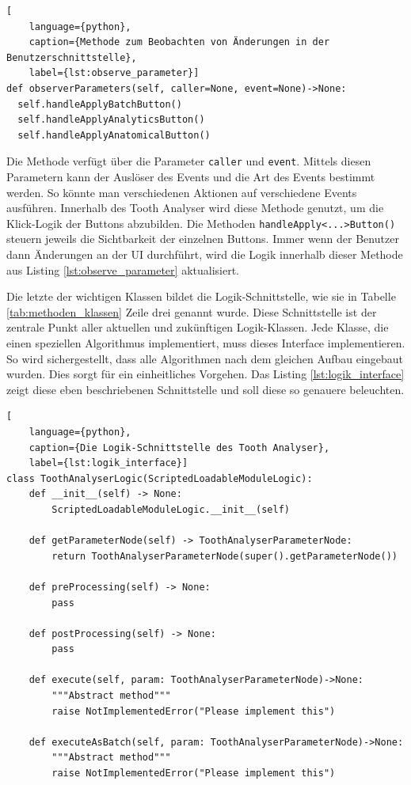 \begin{lstlisting}[
    language={python},
    caption={Methode zum Beobachten von Änderungen in der Benutzerschnittstelle},
    label={lst:observe_parameter}]
def observerParameters(self, caller=None, event=None)->None:
  self.handleApplyBatchButton()
  self.handleApplyAnalyticsButton()
  self.handleApplyAnatomicalButton()
\end{lstlisting}

Die Methode verfügt über die Parameter \texttt{caller} und \texttt{event}.
Mittels diesen Parametern kann der Auslöser des Events und die Art des Events
bestimmt werden. So könnte man verschiedenen Aktionen auf verschiedene Events ausführen.
Innerhalb des Tooth Analyser wird diese Methode genutzt, um die Klick-Logik der Buttons
abzubilden. Die Methoden \texttt{handleApply<...>Button()} steuern jeweils die Sichtbarkeit
der einzelnen Buttons. Immer wenn der Benutzer dann Änderungen an der UI
durchführt, wird die Logik innerhalb dieser Methode aus Listing \ref{lst:observe_parameter}
aktualisiert.

Die letzte der wichtigen Klassen bildet die Logik-Schnittstelle, wie sie in
Tabelle \ref{tab:methoden_klassen} Zeile drei genannt wurde. Diese Schnittstelle
ist der zentrale Punkt aller aktuellen und zukünftigen Logik-Klassen. Jede
Klasse, die einen speziellen Algorithmus implementiert, muss dieses Interface
implementieren. So wird sichergestellt, dass alle Algorithmen nach dem gleichen
Aufbau eingebaut wurden. Dies sorgt für ein einheitliches Vorgehen. Das Listing
\ref{lst:logik_interface} zeigt diese eben beschriebenen Schnittstelle und soll
diese so genauere beleuchten.

\pagebreak

\begin{lstlisting}[
    language={python},
    caption={Die Logik-Schnittstelle des Tooth Analyser},
    label={lst:logik_interface}]
class ToothAnalyserLogic(ScriptedLoadableModuleLogic):
    def __init__(self) -> None:
        ScriptedLoadableModuleLogic.__init__(self)

    def getParameterNode(self) -> ToothAnalyserParameterNode:
        return ToothAnalyserParameterNode(super().getParameterNode())

    def preProcessing(self) -> None:
        pass

    def postProcessing(self) -> None:
        pass

    def execute(self, param: ToothAnalyserParameterNode)->None:
        """Abstract method"""
        raise NotImplementedError("Please implement this")

    def executeAsBatch(self, param: ToothAnalyserParameterNode)->None:
        """Abstract method"""
        raise NotImplementedError("Please implement this")
\end{lstlisting}

